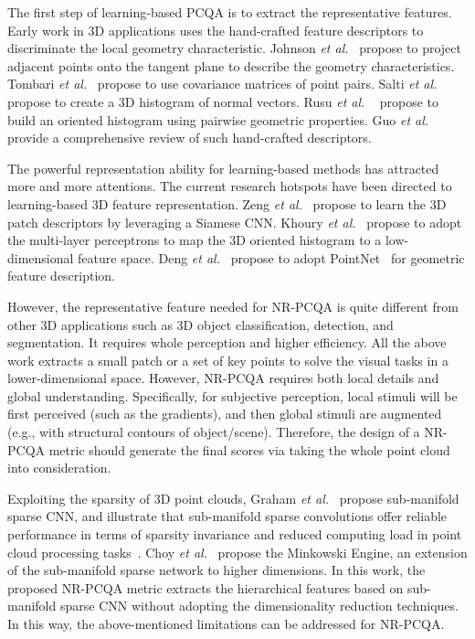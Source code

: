 \documentclass[acmsmall]{acmart}
\begin{document}
\par The first step of learning-based PCQA is to extract the representative features. Early work in 3D applications uses the hand-crafted feature descriptors to discriminate the local geometry characteristic. Johnson \emph{et al.}~\cite{Johnson1999SPIN} propose to project adjacent points onto the tangent plane to describe the geometry characteristics. Tombari \emph{et al.}~\cite{Tombari2010USC} propose to use covariance matrices of point pairs. Salti \emph{et al.}~\cite{Salti2014SHOT} propose to create a 3D histogram of normal vectors. Rusu \emph{et al.} ~\cite{Rusu2008PFH,Rusu2009FPFH} propose to build an oriented histogram using pairwise geometric properties. Guo \emph{et al.}~\cite{Guo2016review} provide a comprehensive review of such hand-crafted descriptors.

\par The powerful representation ability for learning-based methods has attracted more and more attentions. The current research hotspots have been directed to learning-based 3D feature representation. Zeng \emph{et al.}~\cite{Zeng20163DMatch} propose to learn the 3D patch descriptors by leveraging a Siamese CNN. Khoury \emph{et al.}~\cite{Khoury2017Learning} propose to adopt the multi-layer perceptrons to map the 3D oriented histogram to a low-dimensional feature space. Deng \emph{et al.}~\cite{Deng2018PPFNet,Deng2018PPF} propose to adopt PointNet~\cite{Qi2017Pointnet} for geometric feature description.

\par However, the representative feature needed for NR-PCQA is quite different from other 3D applications such as
3D object classification, detection, and segmentation. It requires whole perception and higher efficiency. All the above work extracts a small patch or a set of key points to solve the visual tasks in a lower-dimensional space. However, NR-PCQA requires both local details and global understanding. Specifically, for subjective perception, local stimuli will be first perceived (such as the gradients), and then global stimuli are augmented (e.g., with structural contours of object/scene). Therefore, the design of a NR-PCQA metric should generate the final scores via taking the whole point cloud into consideration.


\par Exploiting the sparsity of 3D point clouds, Graham \emph{et al.}~\cite{Graham2017Submanifold} propose sub-manifold sparse CNN, and illustrate that sub-manifold sparse convolutions offer reliable performance in terms of sparsity invariance and reduced computing load in point cloud processing tasks~\cite{Graham2018submanifold}. Choy \emph{et al.}~\cite{Choy2019Minkowski} propose the Minkowski Engine, an extension of the sub-manifold sparse network to higher dimensions. In this work, the proposed NR-PCQA metric extracts the hierarchical features based on sub-manifold sparse CNN without adopting the dimensionality reduction techniques. In this way, the above-mentioned limitations can be addressed for NR-PCQA.
\end{document}
